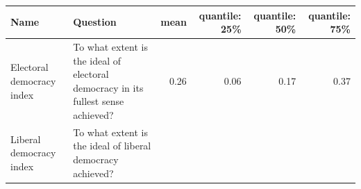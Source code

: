 \documentclass[]{report}
\theoremstyle{definition}
\theoremstyle{definition}
\theoremstyle{definition}
\theoremstyle{remark}
\begin{document}
\begin{longtable}[]{@{}llrrrr@{}}
\toprule
\begin{minipage}[b]{0.16\columnwidth}\raggedright\strut
Name\strut
\end{minipage} & \begin{minipage}[b]{0.42\columnwidth}\raggedright\strut
Question\strut
\end{minipage} & \begin{minipage}[b]{0.03\columnwidth}\raggedleft\strut
mean\strut
\end{minipage} & \begin{minipage}[b]{0.08\columnwidth}\raggedleft\strut
quantile: 25\%\strut
\end{minipage} & \begin{minipage}[b]{0.08\columnwidth}\raggedleft\strut
quantile: 50\%\strut
\end{minipage} & \begin{minipage}[b]{0.08\columnwidth}\raggedleft\strut
quantile: 75\%\strut
\end{minipage}\tabularnewline
\midrule
\endhead
\begin{minipage}[t]{0.16\columnwidth}\raggedright\strut
Electoral democracy index\strut
\end{minipage} & \begin{minipage}[t]{0.42\columnwidth}\raggedright\strut
To what extent is the ideal of electoral democracy in its fullest sense
achieved?\strut
\end{minipage} & \begin{minipage}[t]{0.03\columnwidth}\raggedleft\strut
0.26\strut
\end{minipage} & \begin{minipage}[t]{0.08\columnwidth}\raggedleft\strut
0.06\strut
\end{minipage} & \begin{minipage}[t]{0.08\columnwidth}\raggedleft\strut
0.17\strut
\end{minipage} & \begin{minipage}[t]{0.08\columnwidth}\raggedleft\strut
0.37\strut
\end{minipage}\tabularnewline
\begin{minipage}[t]{0.16\columnwidth}\raggedright\strut
Liberal democracy index\strut
\end{minipage} & \begin{minipage}[t]{0.42\columnwidth}\raggedright\strut
To what extent is the ideal of liberal democracy achieved?\strut
\end{minipage} & \begin{minipage}[t]{0.03\columnwidth}\raggedleft\strut

\end{minipage}
\end{longtable}
\end{document}
